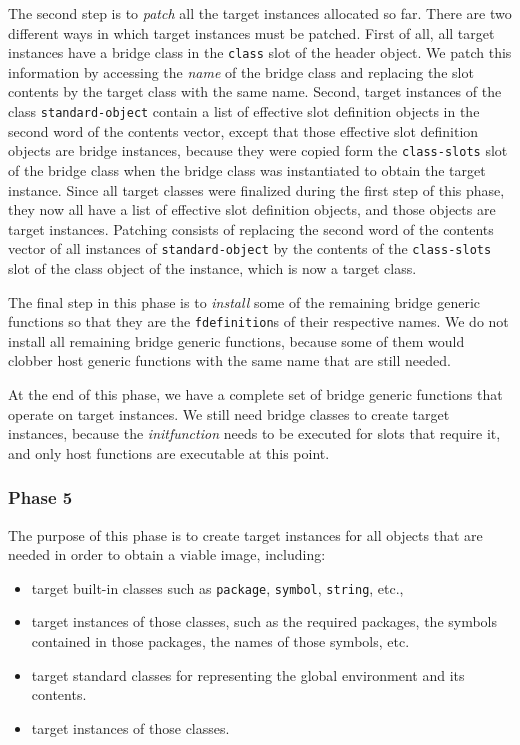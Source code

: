 The second step is to \emph{patch} all the target instances allocated
so far.  There are two different ways in which target instances must
be patched.  First of all, all target instances have a bridge class in
the \texttt{class} slot of the header object.  We patch this
information by accessing the \emph{name} of the bridge class and
replacing the slot contents by the target class with the same name.
Second, target instances of the class \texttt{standard-object} contain
a list of effective slot definition objects in the second word of the
contents vector, except that those effective slot definition objects
are bridge instances, because they were copied form the
\texttt{class-slots} slot of the bridge class when the bridge class
was instantiated to obtain the target instance.  Since all target
classes were finalized during the first step of this phase, they now
all have a list of effective slot definition objects, and those
objects are target instances.  Patching consists of replacing the
second word of the contents vector of all instances of
\texttt{standard-object} by the contents of the \texttt{class-slots}
slot of the class object of the instance, which is now a target
class. 

The final step in this phase is to \emph{install} some of the
remaining bridge generic functions so that they are the
\texttt{fdefinition}s of their respective names.  We do not install
all remaining bridge generic functions, because some of them would
clobber host generic functions with the same name that are still
needed.  

At the end of this phase, we have a complete set of bridge generic
functions that operate on target instances.  We still need bridge
classes to create target instances, because the \emph{initfunction}
needs to be executed for slots that require it, and only host
functions are executable at this point.

\subsubsection{Phase 5}

The purpose of this phase is to create target instances for all
objects that are needed in order to obtain a viable image, including: 

\begin{itemize}
\item target built-in classes such as \texttt{package}, \texttt{symbol},
  \texttt{string}, etc., 
\item target instances of those classes, such as the required
  packages, the symbols contained in those packages, the names of
  those symbols, etc.
\item target standard classes for representing the global environment
  and its contents.
\item target instances of those classes.
\end{itemize}

